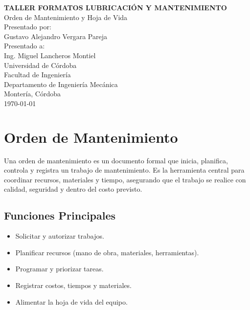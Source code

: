 \documentclass[12pt,letterpaper]{article}
\begin{document}
\begin{titlepage}
\centering

{\Large\textbf{TALLER FORMATOS 
LUBRICACIÓN Y MANTENIMIENTO }}\\[0.5cm]
{\large Orden de Mantenimiento y Hoja de Vida}\\[2cm]

{\large Presentado por:}\\[0.5cm]
{\large Gustavo Alejandro Vergara Pareja}\\%

{\large Presentado a:}\\[0.5cm]
{\large Ing. Miguel Lancheros Montiel}\\[2cm]

{\large Universidad de Córdoba}\\
{\large Facultad de Ingeniería}\\
{\large Departamento de Ingeniería Mecánica}\\[5cm]

{\large Montería, Córdoba}\\
{\large \today}

\end{titlepage}

\newpage
\tableofcontents
\newpage


\section{Orden de Mantenimiento}

Una orden de mantenimiento es un documento formal que inicia, planifica, controla y registra un trabajo de mantenimiento. Es la herramienta central para coordinar recursos, materiales y tiempo, asegurando que el trabajo se realice con calidad, seguridad y dentro del costo previsto.

\subsection{Funciones Principales}
\begin{itemize}
    \item Solicitar y autorizar trabajos.
    \item Planificar recursos (mano de obra, materiales, herramientas).
    \item Programar y priorizar tareas.
    \item Registrar costos, tiempos y materiales.
    \item Alimentar la hoja de vida del equipo.
\end{itemize}
\end{document}
